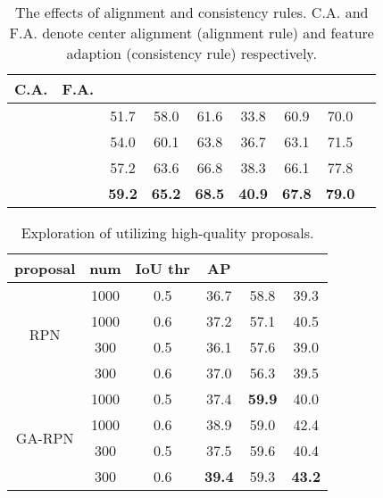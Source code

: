 \documentclass[10pt,twocolumn,letterpaper]{article}
\begin{document}
\begin{table}[t]
	\centering
	\caption{\small{The effects of alignment and consistency rules. C.A. and F.A. denote center alignment (alignment rule) and feature adaption (consistency rule) respectively.}}
	\addtolength{\tabcolsep}{-2pt}
	\small{
		\begin{tabular}{*{9}{c}}
			\toprule
			C.A.   & F.A.      &  &  &  &  &  &  \\
			\midrule
			&          &              51.7              & 58.0              &  61.6              & 33.8            & 60.9            & 70.0         \\
			\checkmark &    &         54.0              & 60.1              & 63.8               & 36.7            & 63.1            & 71.5        \\
			& \checkmark &            57.2              & 63.6              & 66.8               & 38.3            & 66.1            & 77.8        \\
			\checkmark & \checkmark &  \textbf{59.2}     & \textbf{65.2}     & \textbf{68.5}      & \textbf{40.9}   & \textbf{67.8}   & \textbf{79.0}   \\
			\bottomrule
		\end{tabular}
	}
	\vspace{-0.2cm}
	\label{tab:alignment_consistency}
\end{table}

\begin{table}[t]
	\centering
	\caption{\small{Exploration of utilizing high-quality proposals.}}
	\addtolength{\tabcolsep}{-2pt}
	\small{
		\begin{tabular}{*{6}{c}}
			\toprule
			proposal                & num  & IoU thr & AP            &  &  \\
			\midrule
			\multirow{4}{*}{RPN}    & 1000 & 0.5         & 36.7          & 58.8             & 39.3             \\
			& 1000 & 0.6         & 37.2          & 57.1             & 40.5             \\
			& 300  & 0.5         & 36.1          & 57.6             & 39.0             \\
			& 300  & 0.6         & 37.0          & 56.3             & 39.5             \\
			\midrule
			\multirow{4}{*}{GA-RPN} & 1000 & 0.5         & 37.4          & \textbf{59.9}    & 40.0             \\
			& 1000 & 0.6         & 38.9          & 59.0             & 42.4             \\
			& 300  & 0.5         & 37.5          & 59.6             & 40.4             \\
			& 300  & 0.6         & \textbf{39.4} & 59.3             & \textbf{43.2}    \\
			\bottomrule
		\end{tabular}
	}
	\label{tab:proposal-utilization}
	\vspace{-10pt}
\end{table}
\end{document}
